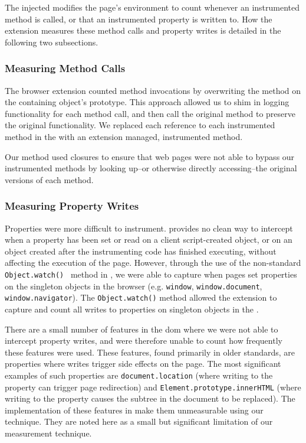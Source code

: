 The injected \JS modifies the page's environment to count whenever an
instrumented method is called, or that an instrumented property is written to.
How the extension measures these method calls and property writes is detailed
in the following two subsections.


\subsubsection{Measuring Method Calls}
The browser extension counted method invocations by overwriting the method on
the containing object's prototype.  This approach allowed us to shim in
logging functionality for each method call, and then call the original method
to preserve the original functionality.  We replaced each reference to each
instrumented method in the \WAPI with an extension managed, instrumented
method.

Our method used \JS closures to ensure that web pages were not able to bypass
our instrumented methods by looking up--or otherwise directly
accessing--the original versions of each method.


\subsubsection{Measuring Property Writes}
Properties were more difficult to instrument.  \JS provides no clean way to
intercept when a property has been set or read on a client script-created
object, or on an object created after the instrumenting code has finished
executing, without affecting the execution of the page.  However, through the
use of the non-standard \texttt{Object.watch()}~\cite{mozillaobjectwatch}
method in \FF, we were able to capture when pages set properties on the
singleton objects in the browser (e.g. \texttt{window},
\texttt{window.document}, \texttt{window.navigator}).  The
\texttt{Object.watch()} method allowed the extension to capture and count all
writes to properties on singleton objects in the \WAPI.

There are a small number of features in the \gls{dom} where we were not able to
intercept property writes, and were therefore unable to count how frequently
these features were used.  These features, found primarily in older standards,
are properties where writes trigger side effects on the page.  The most
significant examples of such properties are \texttt{document.location} (where
writing to the property can trigger page redirection) and
\texttt{Element.prototype.innerHTML} (where writing to the property causes the
subtree in the document to be replaced).  The implementation of these features
in \FF make them unmeasurable using our technique.  They are noted here as a
small but significant limitation of our measurement technique.


